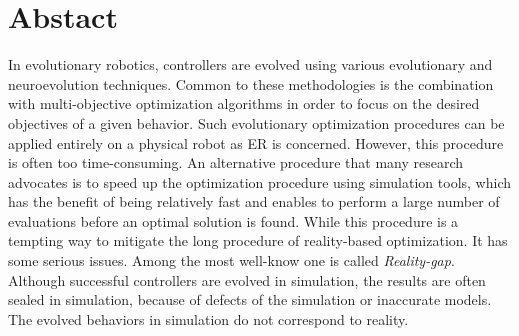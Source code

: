\cleardoublepage
\chapter*{Abstact}

\thispagestyle{empty}
\vspace{1cm}

In evolutionary robotics,  controllers are evolved using various evolutionary and neuroevolution techniques. Common to these methodologies is the combination with multi-objective optimization algorithms in order to focus on the desired objectives of a given behavior. Such evolutionary optimization procedures can be applied entirely on a physical robot as ER is concerned. However, this procedure is often too time-consuming. An alternative procedure that many research advocates is to speed up the optimization procedure using simulation tools, which has the benefit of being relatively fast and enables to perform a large number of evaluations before an optimal solution is found. While this procedure is a tempting way to mitigate the long procedure of reality-based optimization. It has some serious issues. Among the most well-know one is called \emph{Reality-gap}. Although successful controllers are evolved in simulation, the results are often sealed in simulation, because of defects of the simulation or inaccurate models. The evolved behaviors in simulation do not correspond to reality.

